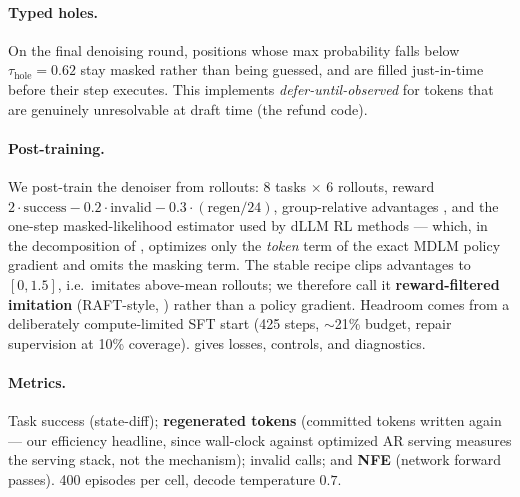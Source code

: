 \documentclass{article}
\newcommand{\thole}{\tau_{\mathrm{hole}}}
\begin{document}
\paragraph{Typed holes.} On the final denoising round, positions whose max probability falls below
$\thole{=}0.62$ stay masked rather than being guessed, and are filled just-in-time before their step
executes. This implements \emph{defer-until-observed} for tokens that are genuinely unresolvable at
draft time (the refund code).

\paragraph{Post-training.} We post-train the denoiser from rollouts: $8$ tasks $\times$ $6$
rollouts, reward $2\cdot\text{success} - 0.2\cdot\text{invalid} - 0.3\cdot(\text{regen}/24)$,
group-relative advantages \citep{grpo2024}, and the one-step masked-likelihood estimator used by dLLM
RL methods \citep{d1_2025,llada15_2025} --- which, in the decomposition of \citet{raajesh2026maskaware},
optimizes only the \emph{token} term of the exact MDLM policy gradient and omits the masking term.
The stable recipe clips advantages to $[0,1.5]$, i.e.\ imitates above-mean rollouts; we therefore
call it \textbf{reward-filtered imitation} (RAFT-style, \citealp{raft2023}) rather than a policy
gradient. Headroom comes from a deliberately compute-limited SFT start (425 steps, $\sim$21\%
budget, repair supervision at 10\% coverage).  gives losses, controls, and diagnostics.

\paragraph{Metrics.} Task success (state-diff); \textbf{regenerated tokens} (committed tokens written
again --- our efficiency headline, since wall-clock against optimized AR serving measures the serving
stack, not the mechanism); invalid calls; and \textbf{NFE} (network forward passes). 400 episodes per
cell, decode temperature $0.7$.

\begin{table}[t]
\centering
\caption{\textbf{Main results} (5 training seeds, 400 episodes/cell, mean$\pm$std over seeds).
$n$ = perturbations per episode; $n{=}2$ combinations are held out from training. Regen./NFE/Invalid
are per episode at $n{=}1$. Masker P/R is against the oracle invalidation set. All repair-capable
agents match on success at $n{=}1$; they differ by $\sim$44$\times$ in regeneration.}
\label{tab:main}
\footnotesize
\setlength{\tabcolsep}{3.2pt}

\end{table}
\end{document}
